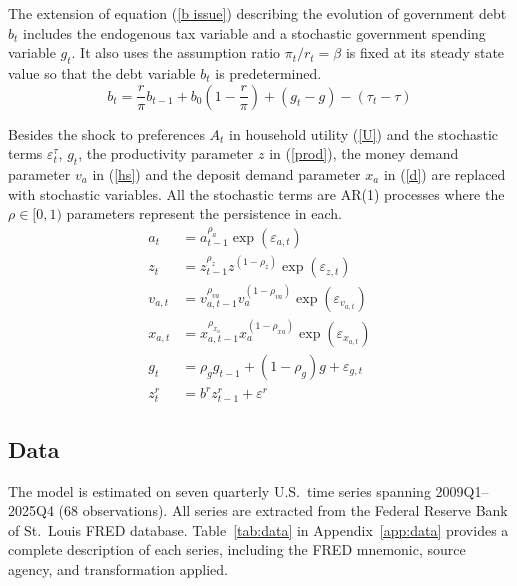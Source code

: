 \documentclass[]{article}
\begin{document}
The extension of equation (\ref{b issue}) describing the evolution of government debt $b_{t}$ includes the endogenous tax variable and a stochastic government spending variable $g_{t}$. It also uses the assumption ratio $\pi_{t}/r_{t}=\beta$ is fixed at its steady state value so that the debt variable $b_{t}$ is predetermined.
\begin{equation}
 b_t = \frac{r}{\pi}b_{t-1}+ b_0\left(1 - \frac{r}{\pi}\right) + (g_{t} - g) - ( \tau_t -\tau)
  \label{b issue est}
\end{equation}

Besides the shock to preferences $A_{t}$ in household utility (\ref{U}) and the stochastic terms $\varepsilon^\tau_t$, $g_{t}$, the productivity parameter $z$ in (\ref{prod}), the money demand parameter $v_{a}$ in (\ref{hs}) and the deposit demand parameter $x_{a}$ in (\ref{d}) are replaced with stochastic variables. All the stochastic terms are AR(1) processes where the $\rho\in [0,1)$ parameters represent the persistence in each.
\begin{align*}
a_t &= a_{t-1}^{\rho_a} \exp(\varepsilon_{a,t}) \\
z_t &= z_{t-1}^{\rho_z} z^{(1-\rho_z)} \exp(\varepsilon_{z,t}) \\
v_{a,t} &= v_{a,t-1}^{\rho_{va}} v_{a}^{(1-\rho_{va})} \exp(\varepsilon_{v_{a,t}}) \\
x_{a,t} &= x_{a,t-1}^{\rho_{x_{a}}} x_{a}^{(1-\rho_{xa})} \exp(\varepsilon_{x_{a,t}}) \\
g_t &= \rho_g g_{t-1} + (1-\rho_g) g + \varepsilon_{g,t} \\
z_t^r &= b^r z_{t-1}^r + \varepsilon^r
\end{align*}

\subsection{Data}

The model is estimated on seven quarterly U.S.\ time series spanning 2009Q1--2025Q4 (68 observations).  All series are extracted from the Federal Reserve Bank of St.\ Louis FRED database.  Table~\ref{tab:data} in Appendix~\ref{app:data} provides a complete description of each series, including the FRED mnemonic, source agency, and transformation applied.
\end{document}
